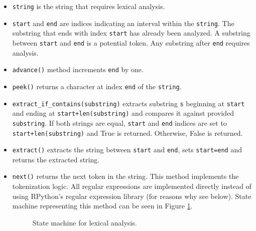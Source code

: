 \begin{itemize}
\item
\texttt{string} is the string that requires lexical analysis.

\item
\texttt{start} and \texttt{end} are indices indicating an interval within the \texttt{string}. The substring that ends with index \texttt{start} has already been analyzed. A substring between \texttt{start} and \texttt{end} is a potential token. Any substring after \texttt{end} requires analysis.

\item
\texttt{advance()} method increments \texttt{end} by one.

\item
\texttt{peek()} returns a character at index \texttt{end} of the \texttt{string}.

\item
\texttt{extract\_if\_contains(substring)} extracts substring \texttt{s} beginning at \texttt{start} and ending at \texttt{start+len(substring)} and compares it against provided \texttt{substring}. If both strings are equal, \texttt{start} and \texttt{end} indices are set to \texttt{start+len(substring)} and True is returned. Otherwise, False is returned.

\item
\texttt{extract()} extracts the string between \texttt{start} and \texttt{end}, sets \texttt{start=end} and returns the extracted string.

\item
	\texttt{next()} returns the next token in the string. This method implements the tokenization logic. All regular expressions are implemented directly instead of using RPython's regular expression library (for reasons why see below). State machine representing this method can be seen in Figure \ref{lexical-analysis-tokenize}.

\begin{figure}[th!]
	\centering
\caption{State machine for lexical analysis.}
\label{lexical-analysis-tokenize}
\end{figure}


\end{itemize}
